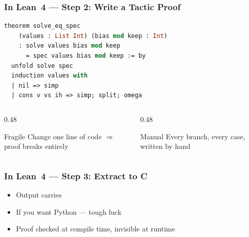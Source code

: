 \begin{frame}[fragile]
\frametitle{In Lean~4 --- Step 2: Write a Tactic Proof}
\begin{lstlisting}[language=ML,morekeywords={theorem,by,unfold,induction,with,nil,cons,simp,split,omega}]
theorem solve_eq_spec
    (values : List Int) (bias mod keep : Int)
    : solve values bias mod keep
      = spec values bias mod keep := by
  unfold solve spec
  induction values with
  | nil => simp
  | cons v vs ih => simp; split; omega
\end{lstlisting}
\vfill
\begin{columns}[T]
\begin{column}{0.48\textwidth}
\begin{alertblock}{Fragile}
Change one line of code $\Rightarrow$\\
proof breaks entirely
\end{alertblock}
\end{column}
\begin{column}{0.48\textwidth}
\begin{alertblock}{Manual}
Every branch, every case,\\
written by hand
\end{alertblock}
\end{column}
\end{columns}
\end{frame}

\begin{frame}
\frametitle{In Lean~4 --- Step 3: Extract to C}
\begin{center}
\end{center}
\vfill
\begin{itemize}
  \item Output carries 
  \item If you want Python --- tough luck
  \item Proof checked at compile time, invisible at runtime
\end{itemize}
\end{frame}

